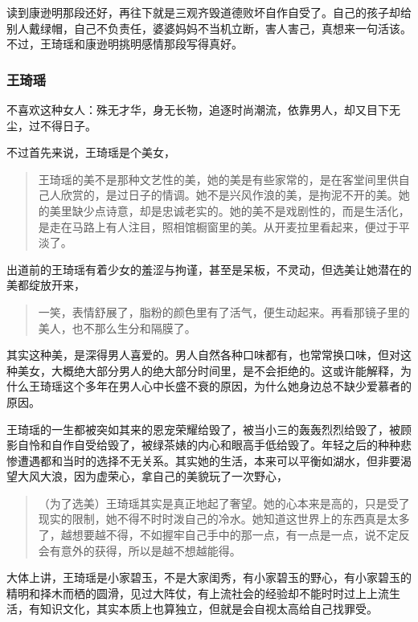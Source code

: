 读到康逊明那段还好，再往下就是三观齐毁道德败坏自作自受了。自己的孩子却给别人戴绿帽，自己不负责任，婆婆妈妈不当机立断，害人害己，真想来一句活该。不过，王琦瑶和康逊明挑明感情那段写得真好。

\subsubsection{王琦瑶}

不喜欢这种女人：殊无才华，身无长物，追逐时尚潮流，依靠男人，却又目下无尘，过不得日子。

不过首先来说，王琦瑶是个美女，
\begin{quotation}
王琦瑶的美不是那种文艺性的美，她的美是有些家常的，是在客堂间里供自己人欣赏的，是过日子的情调。她不是兴风作浪的美，是拘泥不开的美。她的美里缺少点诗意，却是忠诚老实的。她的美不是戏剧性的，而是生活化，是走在马路上有人注目，照相馆橱窗里的美。从开麦拉里看起来，便过于平淡了。
\end{quotation}
出道前的王琦瑶有着少女的羞涩与拘谨，甚至是呆板，不灵动，但选美让她潜在的美都绽放开来，
\begin{quotation}
一笑，表情舒展了，脂粉的颜色里有了活气，便生动起来。再看那镜子里的美人，也不那么生分和隔膜了。
\end{quotation}
其实这种美，是深得男人喜爱的。男人自然各种口味都有，也常常换口味，但对这种美女，大概绝大部分男人的绝大部分时间里，是不会拒绝的。这或许能解释，为什么王琦瑶这个多年在男人心中长盛不衰的原因，为什么她身边总不缺少爱慕者的原因。

王琦瑶的一生都被突如其来的恩宠荣耀给毁了，被当小三的轰轰烈烈给毁了，被顾影自怜和自作自受给毁了，被绿茶婊的内心和眼高手低给毁了。年轻之后的种种悲惨遭遇都和当时的选择不无关系。其实她的生活，本来可以平衡如湖水，但非要渴望大风大浪，因为虚荣心，拿自己的美貌玩了一次野心，
\begin{quotation}
（为了选美）王琦瑶其实是真正地起了奢望。她的心本来是高的，只是受了现实的限制，她不得不时时泼自己的冷水。她知道这世界上的东西真是太多了，越想要越不得，不如握牢自己手中的那一点，有一点是一点，说不定反会有意外的获得，所以是越不想越能得。
\end{quotation}
大体上讲，王琦瑶是小家碧玉，不是大家闺秀，有小家碧玉的野心，有小家碧玉的精明和择木而栖的圆滑，见过大阵仗，有上流社会的经验却不能时时过上上流生活，有知识文化，其实本质上也算独立，但就是会自视太高给自己找罪受。

